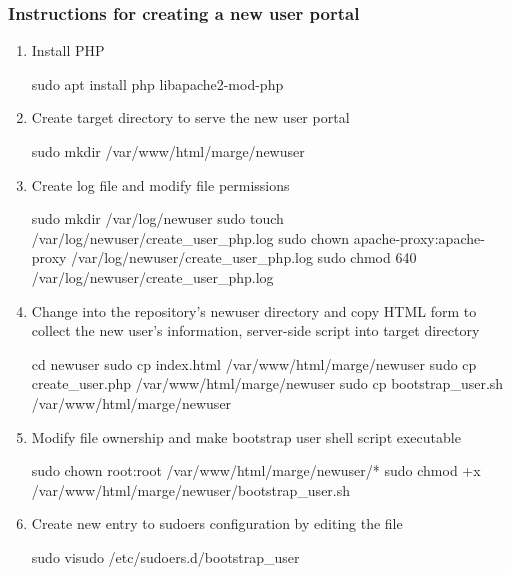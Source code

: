 

\subsubsection*{Instructions for creating a new user portal}

\begin{enumerate}
    \item Install PHP 
    \begin{terminal}
        sudo apt install php libapache2-mod-php
    \end{terminal}
    \item Create target directory to serve the new user portal
    \begin{terminal}
        sudo mkdir /var/www/html/marge/newuser
    \end{terminal}
    \item Create log file and modify file permissions
    \begin{terminal}
        sudo mkdir /var/log/newuser
        sudo touch /var/log/newuser/create_user_php.log
        sudo chown apache-proxy:apache-proxy /var/log/newuser/create_user_php.log
        sudo chmod 640 /var/log/newuser/create_user_php.log
    \end{terminal}
    \item Change into the repository's newuser directory and copy HTML form to
    collect the new user's information, server-side script into target directory
    \begin{terminal}
        cd newuser
        sudo cp index.html /var/www/html/marge/newuser
        sudo cp create_user.php /var/www/html/marge/newuser
        sudo cp bootstrap_user.sh /var/www/html/marge/newuser
    \end{terminal}
    \item Modify file ownership and make bootstrap user shell script executable
    \begin{terminal}
        sudo chown root:root /var/www/html/marge/newuser/*
        sudo chmod +x /var/www/html/marge/newuser/bootstrap_user.sh
    \end{terminal}
    \item Create new entry to sudoers configuration by editing the file
    \begin{terminal}
        sudo visudo /etc/sudoers.d/bootstrap_user

\end{terminal}
\end{enumerate}
